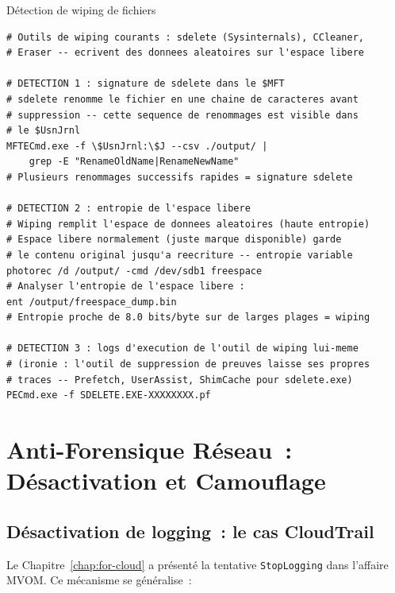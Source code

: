 \begin{boxoutils}{Détection de wiping de fichiers}
\begin{lstlisting}[language=bash_forensique]
# Outils de wiping courants : sdelete (Sysinternals), CCleaner,
# Eraser -- ecrivent des donnees aleatoires sur l'espace libere

# DETECTION 1 : signature de sdelete dans le $MFT
# sdelete renomme le fichier en une chaine de caracteres avant
# suppression -- cette sequence de renommages est visible dans
# le $UsnJrnl
MFTECmd.exe -f \$UsnJrnl:\$J --csv ./output/ |
    grep -E "RenameOldName|RenameNewName"
# Plusieurs renommages successifs rapides = signature sdelete

# DETECTION 2 : entropie de l'espace libere
# Wiping remplit l'espace de donnees aleatoires (haute entropie)
# Espace libere normalement (juste marque disponible) garde
# le contenu original jusqu'a reecriture -- entropie variable
photorec /d /output/ -cmd /dev/sdb1 freespace
# Analyser l'entropie de l'espace libere :
ent /output/freespace_dump.bin
# Entropie proche de 8.0 bits/byte sur de larges plages = wiping

# DETECTION 3 : logs d'execution de l'outil de wiping lui-meme
# (ironie : l'outil de suppression de preuves laisse ses propres
# traces -- Prefetch, UserAssist, ShimCache pour sdelete.exe)
PECmd.exe -f SDELETE.EXE-XXXXXXXX.pf
\end{lstlisting}
\end{boxoutils}

\section{Anti-Forensique Réseau~: Désactivation et Camouflage}
\label{sec:anti-for-reseau}

\subsection{Désactivation de logging~: le cas CloudTrail}

Le Chapitre~\ref{chap:for-cloud} a présenté la tentative
\texttt{StopLogging} dans l'affaire MVOM. Ce mécanisme se généralise~:

